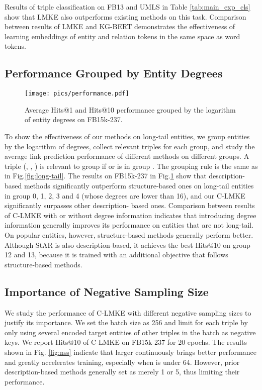 \documentclass{article}
\begin{document}
Results of triple classification on FB13 and UMLS in Table \ref{tab:main_exp_cls} show that LMKE also outperforms existing methods on this task. Comparison between results of LMKE and KG-BERT demonstrates the effectiveness of learning embeddings of entity and relation tokens in the same space as word tokens. 


\subsection{Performance Grouped by Entity Degrees}
\begin{figure}[b]
    \centering
\texttt{[image: pics/performance.pdf]}
    \caption{
    Average Hits@1 and Hits@10 performance grouped by the logarithm of entity degrees on FB15k-237. }
    \label{fig:groupby}
\end{figure}
To show the effectiveness of our methods on long-tail entities, 
we group entities by the logarithm of degrees,
collect relevant triples for each group,
and study the average link prediction performance of different methods on different groups. 
A triple (, , ) is relevant to group  if  or  is in group . 
The grouping rule is the same as in Fig.\ref{fig:long-tail}.
The results on FB15k-237 in Fig.\ref{fig:groupby} show that description-based methods significantly outperform structure-based ones on long-tail entities in group 0, 1, 2, 3 and 4 (whose degrees are lower than 16), and our C-LMKE significantly surpasses other description-
based ones.  
Comparison between results of C-LMKE with or without degree information indicates that introducing degree information generally improves its performance on entities that are not long-tail.  
On popular entities, however, structure-based methods generally perform better. 
Although StAR is also description-based, it achieves the best Hits@10 on group 12 and 13, 
because it is trained with an additional objective that follows structure-based methods. 


\subsection{Importance of Negative Sampling Size}

We study the performance of C-LMKE with different negative sampling sizes  to justify its importance. 
We set the batch size as 256 and limit  for each triple by only using several encoded target entities of other triples in the batch as negative keys. 
We report Hits@10 of C-LMKE on FB15k-237 for 20 epochs. 
The results shown in Fig. \ref{fig:nss} indicate that larger  continuously brings better performance and greatly accelerates training, especially when  is under 64. 
However, prior description-based methods generally set   as merely 1 or 5, thus limiting their performance.
\end{document}
